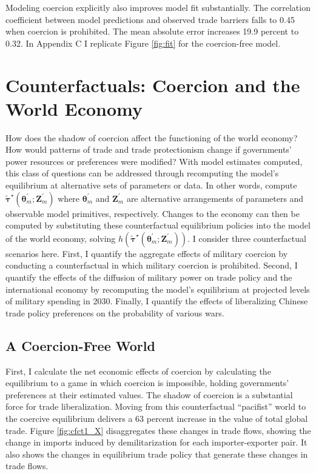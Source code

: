 \documentclass{puthesis}
\begin{document}
Modeling coercion explicitly also improves model fit substantially. The
correlation coefficient between model predictions and observed trade
barriers falls to 0.45 when coercion is prohibited. The mean absolute
error increases 19.9 percent to 0.32. In Appendix C I replicate Figure
\ref{fig:fit} for the coercion-free model.

\section{Counterfactuals: Coercion and the World Economy}

How does the shadow of coercion affect the functioning of the world
economy? How would patterns of trade and trade protectionism change if
governments' power resources or preferences were modified? With model
estimates computed, this class of questions can be addressed through
recomputing the model's equilibrium at alternative sets of parameters or
data. In other words, compute
\(\tilde{\bm{\tau}}^\star(\bm{\theta}_m^\prime; \bm{Z}_m^\prime)\) where
\(\bm{\theta}_m^\prime\) and \(\bm{Z}_m^\prime\) are alternative
arrangements of parameters and observable model primitives,
respectively. Changes to the economy can then be computed by
substituting these counterfactual equilibrium policies into the model of
the world economy, solving
\(h \left( \tilde{\bm{\tau}}^\star(\bm{\theta}_m^\prime; \bm{Z}_m^\prime) \right)\).
I consider three counterfactual scenarios here. First, I quantify the
aggregate effects of military coercion by conducting a counterfactual in
which military coercion is prohibited. Second, I quantify the effects of
the diffusion of military power on trade policy and the international
economy by recomputing the model's equilibrium at projected levels of
military spending in 2030. Finally, I quantify the effects of
liberalizing Chinese trade policy preferences on the probability of
various wars.

\subsection{A Coercion-Free World}

First, I calculate the net economic effects of coercion by calculating
the equilibrium to a game in which coercion is impossible, holding
governments' preferences at their estimated values. The shadow of
coercion is a substantial force for trade liberalization. Moving from
this counterfactual ``pacifist'' world to the coercive equilibrium
delivers a 63 percent increase in the value of total global trade.
Figure \ref{fig:cfct1_X} disaggregates these changes in trade flows,
showing the change in imports induced by demilitarization for each
importer-exporter pair. It also shows the changes in equilibrium trade
policy that generate these changes in trade flows.
\end{document}
